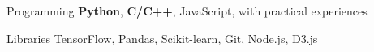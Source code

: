 


\begin{cvskills}


\cvskill
{Programming} %
{\textbf{Python}, \textbf{C/C++}, JavaScript, with practical experiences} %


\cvskill
{Libraries} %
{TensorFlow, Pandas, Scikit-learn, Git, Node.js, D3.js} %




\end{cvskills}